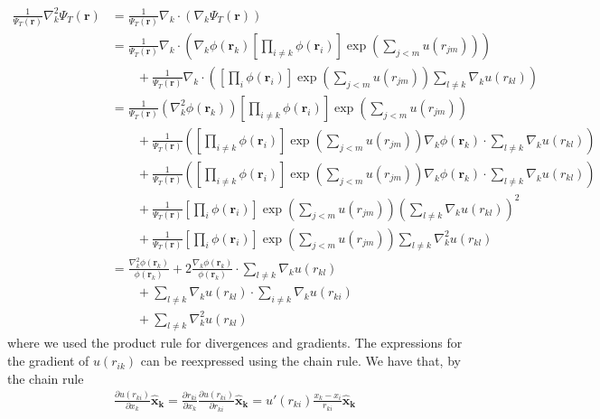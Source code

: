 \documentclass[%
oneside,                 %
final,                   %
10pt]{article}
\begin{document}
\begin{align*}
   \frac{1}{\Psi_T(\mathbf{r})}\nabla_k^2\Psi_T(\mathbf{r}) & = \frac{1}{\Psi_T(\mathbf{r})} \nabla_k \cdot \left(\nabla_k\Psi_T(\mathbf{r})\right) \\
   & = \frac{1}{\Psi_T(\mathbf{r})} \nabla_k \cdot \left(\nabla_k\phi(\mathbf{r}_k)\left[\prod_{i\ne k}\phi(\mathbf{r}_i)\right]\exp{\left(\sum_{j<m}u(r_{jm})\right)}\right)
  \\
  &\qquad
  + \frac{1}{\Psi_T(\mathbf{r})} \nabla_k \cdot \left( \left[\prod_i\phi(\mathbf{r}_i)\right]
  \exp{\left(\sum_{j<m}u(r_{jm})\right)}\sum_{l\ne k}\nabla_k u(r_{kl}) \right) \\ 
  & =  \frac{1}{\Psi_T(\mathbf{r})} \left(\nabla_k^2\phi(\mathbf{r}_k)\right)\left[\prod_{i\ne k}\phi(\mathbf{r}_i)\right]\exp{\left(\sum_{j<m}u(r_{jm})\right)}\\ 
  &\qquad +\frac{1}{\Psi_T(\mathbf{r})}\left(\left[\prod_{i\ne k}\phi(\mathbf{r}_i)\right]\exp{\left(\sum_{j<m}u(r_{jm})\right)}\nabla_k\phi(\mathbf{r}_k) \cdot \sum_{l\ne k}\nabla_k u(r_{kl}) \right)\\
  & \qquad+ \frac{1}{\Psi_T(\mathbf{r})}\left(\left[\prod_{i\ne k}\phi(\mathbf{r}_i)\right]\exp{\left(\sum_{j<m}u(r_{jm})\right)}\nabla_k\phi(\mathbf{r}_k) \cdot \sum_{l\ne k}\nabla_k u(r_{kl}) \right)\\
  & \qquad+\frac{1}{\Psi_T(\mathbf{r})} \left[\prod_i\phi(\mathbf{r}_i)\right]
  \exp{\left(\sum_{j<m}u(r_{jm})\right)}\left(\sum_{l\ne k}\nabla_k u(r_{kl})\right)^2 \\
  & \qquad+\frac{1}{\Psi_T(\mathbf{r})} \left[\prod_i\phi(\mathbf{r}_i)\right]
  \exp{\left(\sum_{j<m}u(r_{jm})\right)}\sum_{l\ne k}\nabla_k^2 u(r_{kl})\\
  & = \frac{\nabla_k^2\phi(\mathbf{r}_k)}{\phi(\mathbf{r}_k)}
   + 2\frac{\nabla_k\phi(\mathbf{r}_k)}{\phi(\mathbf{r}_k)}\cdot 
   \sum_{l\ne k}\nabla_k u(r_{kl})
   \\
   &\qquad
   + \sum_{l\ne k}\nabla_k u(r_{kl}) \cdot \sum_{i\ne k}\nabla_k u(r_{ki})
   \\
   &\qquad
   + \sum_{l\ne k}\nabla_k^2 u(r_{kl})
\end{align*}
where we used the product rule for divergences and gradients. The expressions for the gradient of $u(r_{ik})$ can be reexpressed using the chain rule.
We have that, by the chain rule
\begin{align*}
    \frac{\partial u(r_{ki})}{\partial x_k}\mathbf{\hat{x}_k}=\frac{\partial r_{ki}}{\partial x_k}\frac{\partial u(r_{ki})}{\partial r_{ki}}\mathbf{\hat{x}_k}=u'(r_{ki})\frac{x_k-x_i}{r_{ki}}\mathbf{\hat{x}_k}
\end{align*}
\end{document}

